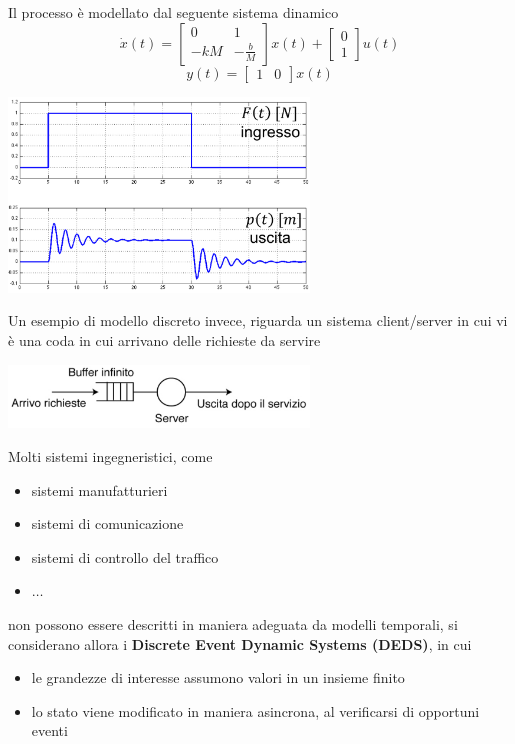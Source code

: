 \documentclass[10pt, letterpaper]{report}
\begin{document}
Il processo è modellato dal seguente sistema dinamico 
$$\dot{x}(t)=\begin{bmatrix}
    0 & 1 \\ 
    -kM & -\frac{b}{M}
\end{bmatrix}x(t)+\begin{bmatrix}
    0\\ 1
\end{bmatrix}u(t) $$
$$ y(t)=\begin{bmatrix}
    1 & 0
\end{bmatrix}x(t)$$\begin{center}
    \includegraphics[width=0.6\textwidth]{images/mollaMassa2.png}
\end{center}
Un esempio di modello discreto invece, riguarda un sistema client/server in cui vi è una coda in cui arrivano delle richieste da servire\begin{center}
    \includegraphics[width=0.6\textwidth]{images/DEDScoda.png}
\end{center}
Molti sistemi ingegneristici, come\begin{itemize}
    \item sistemi manufatturieri 
    \item sistemi di comunicazione 
    \item sistemi di controllo del traffico 
    \item $\dots$
\end{itemize} non possono essere descritti in maniera adeguata da modelli temporali, si considerano allora i \textbf{Discrete Event Dynamic Systems (DEDS)}, in cui \begin{itemize}
    \item le grandezze di interesse assumono valori in un insieme finito 
    \item lo stato viene modificato in maniera asincrona, al verificarsi di opportuni eventi 
\end{itemize}
\end{document}
